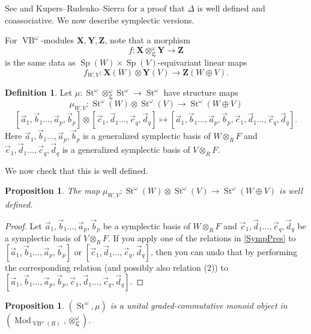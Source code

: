 \documentclass[11pt,letterpaper]{amsart}
\DeclareMathOperator{\Mod}{Mod}
\DeclareMathOperator{\VB}{VB}
\DeclareMathOperator{\Sp}{Sp}
\newcommand{\gX}{\mathbf{X}}
\newcommand{\gY}{\mathbf{Y}}
\newcommand{\gZ}{\mathbf{Z}}
\newcommand{\LL}{\mathfrak{L}}
\numberwithin{theoremcounter}{section}
\newtheorem{proposition}[propositionauto]{Proposition}
\theoremstyle{definition}
\newtheorem{definition}[Defauto]{Definition}
\theoremstyle{remark}
\DeclareMathOperator{\St}{St}
\begin{document}
See \cite{AMP} and Kupers--Rudenko--Sierra \cite{KRS1} for a proof that $\Delta$ is well defined and coassociative. We now describe symplectic versions. 

For $\VB^\omega$-modules $\gX,\gY,\gZ$, note that a morphism $$f\colon \gX \otimes_\LL^\omega \gY \to \gZ $$ is the same data as $\Sp(W) \times \Sp(V)$-equivariant linear maps $$f_{W,V}\colon \gX(W) \otimes \gY(V) \to \gZ(W \oplus V).$$

\begin{definition}
    Let $\mu\colon  \St^\omega \otimes^\omega_\LL \St^\omega \to \St^\omega$ have structure maps $$\mu_{W,V}\colon  \St^\omega(W) \otimes \St^\omega(V) \to \St^\omega(W \oplus V) $$  $$[\vec a_1,\vec b_1\ldots, \vec a_p, \vec b_p ] \otimes [\vec c_1,\vec d_1\ldots, \vec c_q, \vec d_q ] \mapsto [\vec a_1,\vec b_1\ldots, \vec a_p, \vec b_p , \vec c_1,\vec d_1\ldots, \vec c_q, \vec d_q ]. $$ Here $\vec a_1,\vec b_1\ldots, \vec a_p, \vec b_p $ is a generalized symplectic basis of $W \otimes_R F$ and 
    $\vec c_1,\vec d_1\ldots, \vec c_q, \vec d_q $ is a generalized symplectic basis of $V \otimes_R F$.
\end{definition}

We now check that this is well defined. 

\begin{proposition}
The map $\mu_{W,V}\colon  \St^\omega(W) \otimes \St^\omega(V) \to \St^\omega(W \oplus V)$ is well defined.
\end{proposition}
\begin{proof}
Let $\vec a_1,\vec b_1\ldots, \vec a_p, \vec b_p $ be a symplectic basis of $W \otimes_R F$ and 
    $\vec c_1,\vec d_1\ldots, \vec c_q, \vec d_q $ be a symplectic basis of $V \otimes_R F$. If you apply one of the relations in \autoref{SympPres} to $[\vec a_1,\vec b_1\ldots, \vec a_p, \vec b_p]$ or $[\vec c_1,\vec d_1\ldots, \vec c_q, \vec d_q ]$, then you can undo that by performing the corresponding relation (and possibly also relation (2)) to $[\vec a_1,\vec b_1\ldots, \vec a_p, \vec b_p,\vec c_1,\vec d_1\ldots, \vec c_q, \vec d_q ]$. 
\end{proof}
\begin{proposition}
$(\St^{\omega},\mu)$ is a unital graded-commutative monoid object in $(\Mod_{\VB^\omega(R)},\otimes_\LL^\omega)$.    
\end{proposition}
\end{document}
